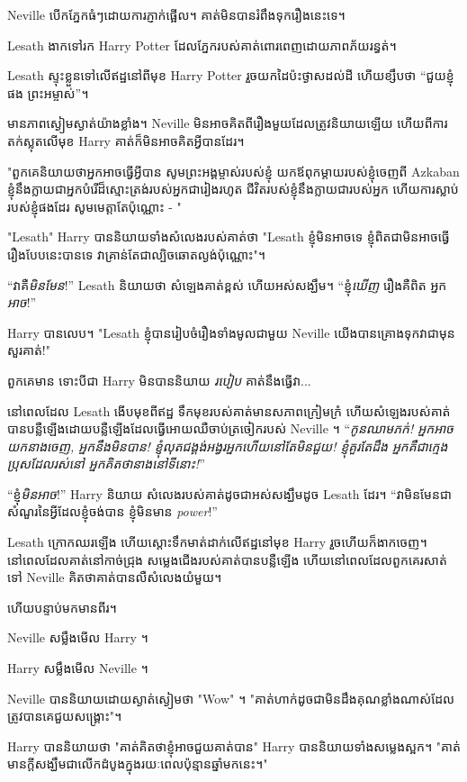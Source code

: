 {{{{Neville បើកភ្នែកធំៗដោយការភ្ញាក់ផ្អើល។ គាត់មិនបានរំពឹងទុករឿងនេះទេ។

Lesath ងាកទៅរក Harry Potter ដែលភ្នែករបស់គាត់ពោរពេញដោយភាពភ័យរន្ធត់។

Lesath ស្ទុះ​ខ្លួន​ទៅ​លើ​ឥដ្ឋ​នៅ​ពី​មុខ Harry Potter រួច​យក​ដៃ​ប៉ះ​ថ្ងាស​ដល់​ដី ហើយ​ខ្សឹប​ថា “ជួយ​ខ្ញុំ​ផង ព្រះអម្ចាស់”។

មាន​ភាព​ស្ងៀមស្ងាត់​យ៉ាង​ខ្លាំង។ Neville មិន​អាច​គិត​ពី​រឿង​មួយ​ដែល​ត្រូវ​និយាយ​ឡើយ ហើយ​ពី​ការ​តក់ស្លុត​លើ​មុខ Harry គាត់​ក៏​មិន​អាច​គិត​អ្វី​បាន​ដែរ។

"ពួកគេនិយាយថាអ្នកអាចធ្វើអ្វីបាន សូមព្រះអង្គម្ចាស់របស់ខ្ញុំ យកឪពុកម្តាយរបស់ខ្ញុំចេញពី Azkaban ខ្ញុំនឹងក្លាយជាអ្នកបំរើដ៏ស្មោះត្រង់របស់អ្នកជារៀងរហូត ជីវិតរបស់ខ្ញុំនឹងក្លាយជារបស់អ្នក ហើយការស្លាប់របស់ខ្ញុំផងដែរ សូមមេត្តាតែប៉ុណ្ណោះ - "

"Lesath" Harry បាននិយាយទាំងសំលេងរបស់គាត់ថា "Lesath ខ្ញុំមិនអាចទេ ខ្ញុំពិតជាមិនអាចធ្វើរឿងបែបនេះបានទេ វាគ្រាន់តែជាល្បិចឆោតល្ងង់ប៉ុណ្ណោះ"។

“វាគឺ\emph{មិនមែន}!” Lesath និយាយ​ថា សំឡេង​គាត់​ខ្ពស់ ហើយ​អស់សង្ឃឹម។ “ខ្ញុំ\emph{ឃើញ} រឿងគឺពិត អ្នក\emph{អាច}!”

Harry បានលេប។ "Lesath ខ្ញុំបានរៀបចំរឿងទាំងមូលជាមួយ Neville យើងបានគ្រោងទុកវាជាមុន សួរគាត់!"

ពួកគេមាន ទោះបីជា Harry មិនបាននិយាយ \emph{របៀប} គាត់នឹងធ្វើវា...

នៅពេលដែល Lesath ងើបមុខពីឥដ្ឋ ទឹកមុខរបស់គាត់មានសភាពក្រៀមក្រំ ហើយសំឡេងរបស់គាត់បានបន្លឺឡើងដោយបន្លឺឡើងដែលធ្វើអោយឈឺចាប់ត្រចៀករបស់ Neville ។ “\emph{កូនឈាមភក់! អ្នក​អាច​យក​នាង​ចេញ​, អ្នក​នឹង​មិន​បាន​! ខ្ញុំលុតជង្គង់អង្វរអ្នកហើយនៅតែមិនជួយ! ខ្ញុំគួរតែដឹង អ្នកគឺជាក្មេងប្រុសដែលរស់នៅ អ្នកគិតថានាងនៅទីនោះ!}”

“ខ្ញុំ\emph{មិនអាច}!” Harry និយាយ សំលេងរបស់គាត់ដូចជាអស់សង្ឃឹមដូច Lesath ដែរ។ “វាមិនមែនជាសំណួរនៃអ្វីដែលខ្ញុំចង់បាន ខ្ញុំមិនមាន \emph{power}!”

Lesath ក្រោកឈរឡើង ហើយស្ដោះទឹកមាត់ដាក់លើឥដ្ឋនៅមុខ Harry រួចហើយក៏ងាកចេញ។ នៅពេលដែលគាត់នៅកាច់ជ្រុង សម្លេងជើងរបស់គាត់បានបន្លឺឡើង ហើយនៅពេលដែលពួកគេរសាត់ទៅ Neville គិតថាគាត់បានលឺសំលេងយំមួយ។

ហើយបន្ទាប់មកមានពីរ។

Neville សម្លឹងមើល Harry ។

Harry សម្លឹងមើល Neville ។

Neville បាននិយាយដោយស្ងាត់ស្ងៀមថា "Wow" ។ "គាត់​ហាក់​ដូចជា​មិន​ដឹង​គុណ​ខ្លាំង​ណាស់​ដែល​ត្រូវ​បាន​គេ​ជួយ​សង្គ្រោះ"។

Harry បាននិយាយថា "គាត់គិតថាខ្ញុំអាចជួយគាត់បាន" Harry បាននិយាយទាំងសម្លេងស្អក។ "គាត់មានក្តីសង្ឃឹមជាលើកដំបូងក្នុងរយៈពេលប៉ុន្មានឆ្នាំមកនេះ។"

}}}}
